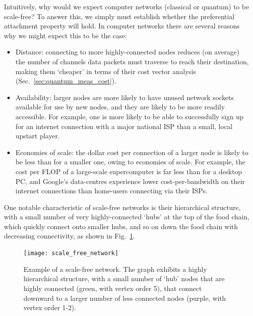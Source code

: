 Intuitively, why would we expect computer networks (classical or quantum) to be scale-free? To answer this, we simply must establish whether the preferential attachment property will hold. In computer networks there are several reasons why we might expect this to be the case:
\begin{itemize}
	\item Distance: connecting to more highly-connected nodes reduces (on average) the number of channels data packets must traverse to reach their destination, making them `cheaper' in terms of their cost vector analysis (Sec.~\ref{sec:quantum_meas_cost}).
	\item Availability: larger nodes are more likely to have unused network sockets available for use by new nodes, and they are likely to be more readily accessible. For example, one is more likely to be able to successfully sign up for an internet connection with a major national ISP than a small, local upstart player.
	\item Economies of scale: the dollar cost per connection of a larger node is likely to be less than for a smaller one, owing to economies of scale. For example, the cost per FLOP of a large-scale supercomputer is far less than for a desktop PC, and Google's data-centres experience lower cost-per-bandwidth on their internet connections than home-users connecting via their ISPs.
\end{itemize}

One notable characteristic of scale-free networks is their hierarchical structure, with a small number of very highly-connected `hubs' at the top of the food chain, which quickly connect onto smaller hubs, and so on down the food chain with decreasing connectivity, as shown in Fig.~\ref{fig:scale_free_net}.

\begin{figure}[!htbp]
\texttt{[image: scale\_free\_network]}
\captionspacefig \caption{Example of a scale-free network. The graph exhibits a highly hierarchical structure, with a small number of `hub' nodes that are highly connected (green, with vertex order 5), that connect downward to a larger number of less connected nodes (purple, with vertex order 1-2).}\label{fig:scale_free_net}
\end{figure}

